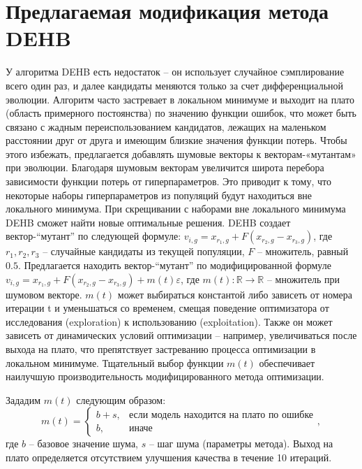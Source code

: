 \documentclass[a4paper,12pt]{article}
\begin{document}
\section{Предлагаемая модификация метода DEHB}
У алгоритма DEHB есть недостаток – он использует случайное сэмплирование всего один раз, и далее кандидаты меняются только за счет дифференциальной эволюции. Алгоритм часто застревает в локальном минимуме и выходит на плато (область примерного постоянства) по значению функции ошибок, что может быть связано с жадным переиспользованием кандидатов, лежащих на маленьком расстоянии друг от друга и имеющим близкие значения функции потерь.
Чтобы этого избежать, предлагается добавлять шумовые векторы к векторам-«мутантам» при эволюции. Благодаря шумовым векторам увеличится широта перебора зависимости функции потерь от гиперпараметров. Это приводит к тому, что некоторые наборы гиперпараметров из популяций будут находиться вне локального минимума. При скрещивании с наборами вне локального минимума DEHB сможет найти новые оптимальные решения.
DEHB создает вектор-``мутант'' по следующей формуле: $v_{i, g} = x_{r_1, g} + F(x_{r_2, g} - x_{r_3, g})$, где $r_1, r_2, r_3$ -- случайные кандидаты из текущей популяции, $F$ -- множитель, равный $0.5$.
Предлагается находить вектор-``мутант'' по модифицированной формуле $v_{i, g} = x_{r_1, g} + F(x_{r_2, g} - x_{r_3, g}) + m(t)\varepsilon$, где $m(t): \mathbb{R} \to \mathbb{R}$ – множитель при шумовом векторе. $m(t)$ может выбираться константой либо зависеть от номера итерации t и уменьшаться со временем, смещая поведение оптимизатора от исследования (exploration) к использованию (exploitation). Также он может зависеть от динамических условий оптимизации – например, увеличиваться после выхода на плато, что препятствует застреванию процесса оптимизации в локальном минимуме. Тщательный выбор функции $m(t)$ обеспечивает наилучшую производительность модифицированного метода оптимизации.

Зададим $m(t)$ следующим образом: 
$$
m(t) = \begin{cases}
			b + s, & \text{если модель находится на плато по ошибке}\\
            b, & \text{иначе}
		 \end{cases},$$ 
где $b$ -- базовое значение шума, $s$ -- шаг шума (параметры метода). Выход на плато определяется отсутствием улучшения качества в течение 10 итераций.
\end{document}
